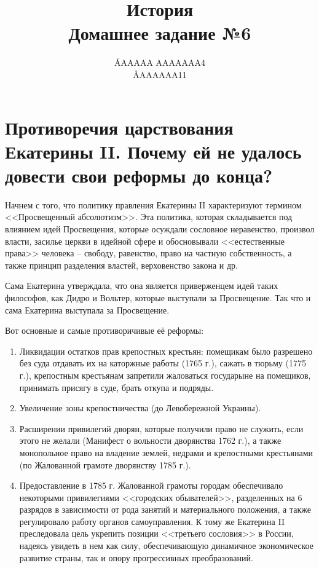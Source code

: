 \documentclass[12pt]{article}
\title{История \\ Домашнее задание №6}
\author{\AA{AAAAA AAAAAAA}{4} \\ \AA{AAAAAA}{11}}
\begin{document}
  \maketitle

  \section{Противоречия царствования Екатерины II. Почему ей не удалось довести свои реформы до конца?}
  Начнем с того, что политику правления Екатерины II характеризуют термином <<Просвещенный абсолютизм>>.
  Эта политика, которая складывается под влиянием идей Просвещения,
  которые осуждали сословное неравенство, произвол власти,
  засилье церкви в идейной сфере и обосновывали <<естественные права>> человека -- свободу,
  равенство, право на частную собственность, а также принцип разделения властей, верховенство закона и др.

  Сама Екатерина утверждала, что она является приверженцем идей таких философов, как Дидро и Вольтер, которые выступали за Просвещение.
  Так что и сама Екатерина выступала за Просвещение.

  Вот основные и самые противоричивые её реформы:
  \begin{enumerate}
    \item
    Ликвидации остатков прав крепостных крестьян:
    помещикам было разрешено без суда отдавать их на каторжные работы (1765 г.), сажать в тюрьму (1775 г.),
    крепостным крестьянам запретили жаловаться государыне на помещиков, принимать присягу в суде, брать откупа и подряды.

    \item
    Увеличение зоны крепостничества (до Левобережной Украины).

    \item
    Расширении привилегий дворян, которые получили право не служить, если этого не желали (Манифест о вольности дворянства 1762 г.),
    а также монопольное право на владение землей, недрами и крепостными крестьянами (по Жалованной грамоте дворянству 1785 г.).

    \item
    Предоставление в 1785 г. Жалованной грамоты городам обеспечивало некоторыми привилегиями <<городских обывателей>>,
    разделенных на 6 разрядов в зависимости от рода занятий и материального положения, а также регулировало работу органов самоуправления.
    К тому же Екатерина II преследовала цель укрепить позиции <<третьего сословия>> в России,
    надеясь увидеть в нем как силу, обеспечивающую динамичное экономическое развитие страны, так и опору прогрессивных преобразований.
  \end{enumerate}
\end{document}

